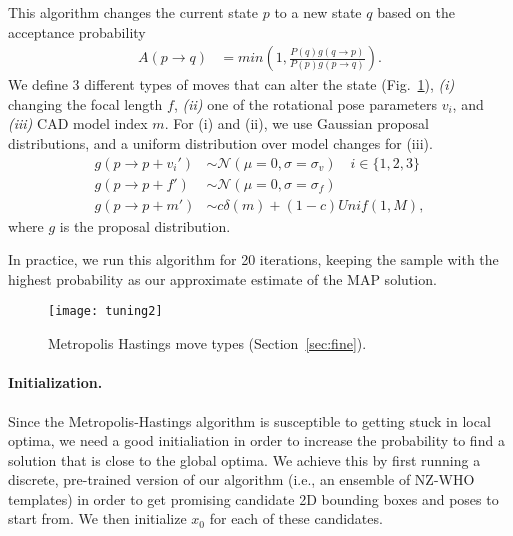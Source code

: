 This algorithm changes the current state $p$ to a new state $q$ based
on the acceptance probability
\begin{align}
    A(p \rightarrow q) & =  min\left( 1,  \frac{P(q) g(q \rightarrow p)}{P(p) g(p \rightarrow q)}\right).
\end{align}
We define $3$ different types of moves that can alter the state
(Fig.~\ref{fig:moves}), {\em (i)} changing the focal length $f$, {\em
(ii)} one of the rotational pose parameters $v_i$, and {\em (iii)} CAD model
index $m$. For (i) and (ii), we use Gaussian proposal distributions, and a uniform
distribution over model changes for (iii). 
\begin{align}
    g(p \rightarrow p + v_i') & \sim \mathcal{N}(\mu = 0,\sigma = \sigma_v) \quad i \in \{1,2,3\}\\
    g(p \rightarrow p + f') & \sim \mathcal{N}(\mu = 0,\sigma = \sigma_f)\\
    g(p \rightarrow p + m') & \sim c \delta(m) + (1-c) Unif(1,M),
\end{align}
where $g$ is the proposal distribution. %
%

In practice, we run this algorithm for 20 iterations, keeping
the sample with the highest probability as our approximate estimate of
the MAP solution. 

\begin{figure}[t]
\centering
    \texttt{[image: tuning2]} \\ [-5pt]
    \caption{Metropolis Hastings move types (Section~\ref{sec:fine}).}
 \label{fig:moves}
\end{figure}


\paragraph{Initialization.}
Since the Metropolis-Hastings algorithm is susceptible to getting
stuck in local optima, we need a good initialiation in order to
increase the probability to find a solution that is close to the
global optima. We achieve this by first running a discrete,
pre-trained version of our algorithm (i.e., an ensemble of NZ-WHO
templates) in order to get promising candidate 2D bounding boxes and
poses to start from. We then initialize $x_0$ for each of these candidates.
